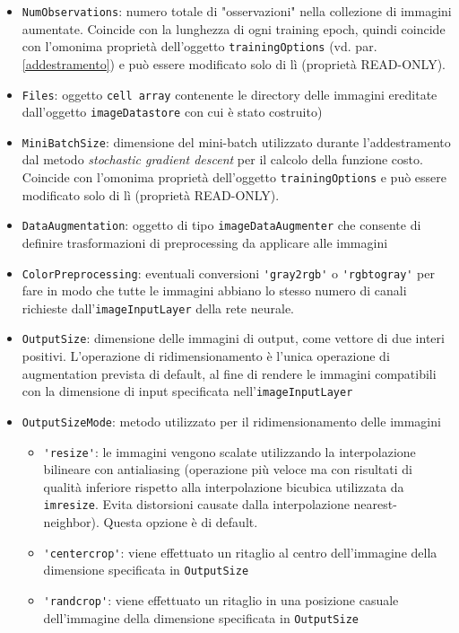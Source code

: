 \begin{itemize}

	\item \verb|NumObservations|: numero totale di "osservazioni" nella collezione di immagini aumentate. Coincide con la lunghezza di ogni training epoch, quindi coincide con l'omonima proprietà dell'oggetto \verb|trainingOptions| (vd. par. \ref{addestramento}) e può essere modificato solo di lì (proprietà READ-ONLY).
	
	\item \verb|Files|: oggetto \verb|cell array| contenente le directory delle immagini ereditate dall'oggetto \verb|imageDatastore| con cui è stato costruito)
	
	\item \verb|MiniBatchSize|: dimensione del mini-batch utilizzato durante l'addestramento dal metodo \textit{stochastic gradient descent} per il calcolo della funzione costo. Coincide con l'omonima proprietà dell'oggetto \verb|trainingOptions| e può essere modificato solo di lì (proprietà READ-ONLY).
	
	\item \verb|DataAugmentation|: oggetto di tipo \verb|imageDataAugmenter| che consente di definire trasformazioni di preprocessing da applicare alle immagini
	
	\item \verb|ColorPreprocessing|: eventuali conversioni \verb|'gray2rgb'| o \verb|'rgbtogray'| per fare in modo che tutte le immagini abbiano lo stesso numero di canali richieste dall'\verb|imageInputLayer| della rete neurale.
	
	\item \verb|OutputSize|: dimensione delle immagini di output, come vettore di due interi positivi. L'operazione di ridimensionamento è l'unica operazione di augmentation prevista di default, al fine di rendere le immagini compatibili con la dimensione di input specificata nell'\verb|imageInputLayer|
	
	\item \verb|OutputSizeMode|: metodo utilizzato per il ridimensionamento delle immagini
	
	\begin{itemize}
		\item \verb|'resize'|: le immagini vengono scalate utilizzando la interpolazione bilineare con antialiasing (operazione più veloce ma con risultati di qualità inferiore rispetto alla interpolazione bicubica utilizzata da \verb|imresize|. Evita distorsioni causate dalla interpolazione nearest-neighbor). Questa opzione è di default.
		\item \verb|'centercrop'|: viene effettuato un ritaglio al centro dell'immagine della dimensione specificata in \verb|OutputSize|
		\item \verb|'randcrop'|: viene effettuato un ritaglio in una posizione casuale dell'immagine della dimensione specificata in \verb|OutputSize|
	\end{itemize}
\end{itemize}

